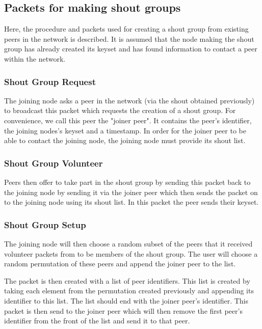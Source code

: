 \documentclass[ %
                    author={Luke Murray},
                supervisor={Dr. Simon Hollis},
                     title={Shadow Peer-to-Peer Networks},
                  subtitle={},
                    degree={MEng},
                      year={2013} ]{thesis}
\begin{document}
\subsection{Packets for making shout groups}
\label{sec:create_shout_group}

Here, the procedure and packets used for creating a shout group from existing peers in the network is described. It is assumed that the node making the shout group has already created its keyset and has found information to contact a peer within the network.

\subsubsection{Shout Group Request}

The joining node asks a peer in the network (via the shout obtained previously) to broadcast this packet which requests the creation of a shout group. For convenience, we call this peer the "joiner peer". It contains the peer's identifier, the joining nodes's keyset and a timestamp. In order for the joiner peer to be able to contact the joining node, the joining node must provide its shout list.

\subsubsection{Shout Group Volunteer}

Peers then offer to take part in the shout group by sending this packet back to the joining node by sending it via the joiner peer which then sends the packet on to the joining node using its shout list. In this packet the peer sends their keyset. 

\subsubsection{Shout Group Setup}

The joining node will then choose a random subset of the peers that it received volunteer packets from to be members of the shout group. The user will choose a random permutation of these peers and append the joiner peer to the list.

The packet is then created with a list of peer identifiers. This list is created by taking each element from the permutation created previously and appending its identifier to this list. The list should end with the joiner peer's identifier. This packet is then send to the joiner peer which will then remove the first peer's identifier from the front of the list and send it to that peer.
\end{document}
